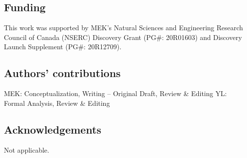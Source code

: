 \documentclass[sn-vancouver,Numbered,lineno,pdflatex]{sn-jnl}
\begin{document}
\subsection*{Funding}\label{funding}

This work was supported by MEK's Natural Sciences and Engineering
Research Council of Canada (NSERC) Discovery Grant (PG\#: 20R01603) and
Discovery Launch Supplement (PG\#: 20R12709).

\subsection*{Authors' contributions}\label{authors-contributions}

MEK: Conceptualization, Writing -- Original Draft, Review \& Editing YL:
Formal Analysis, Review \& Editing

\subsection*{Acknowledgements}\label{acknowledgements}

Not applicable.

\renewcommand\refname{References}

\end{document}
